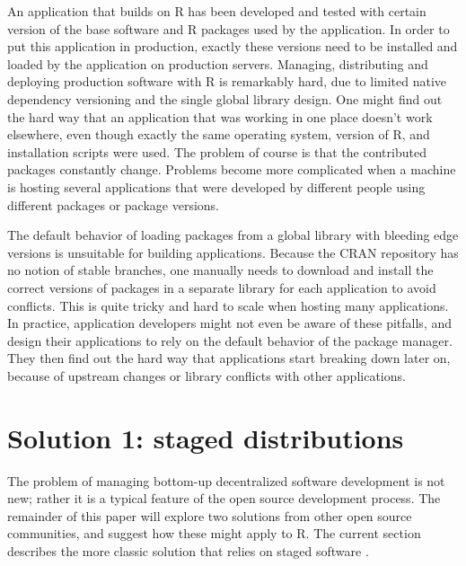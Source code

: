 An application that builds on R has been developed and tested with certain
version of the base software and R packages used by the application. In order
to put this application in production, exactly these versions need to be
installed and loaded by the application on production servers. Managing,
distributing and deploying production software with R is remarkably hard, due
to limited native dependency versioning and the single global library design.
One might find out the hard way that an application that was working in one
place doesn't work elsewhere, even though exactly the same operating system,
version of R, and installation scripts were used. The problem of course is that
the contributed packages constantly change. Problems become more complicated
when a machine is hosting several applications that were developed by different
people using different packages or package versions.

The default behavior of loading packages from a global library with bleeding
edge versions is unsuitable for building applications. Because the CRAN
repository has no notion of stable branches, one manually needs to download and
install the correct versions of packages in a separate library for each
application to avoid conflicts. This is quite tricky and hard to scale when
hosting many applications. In practice, application developers might not even be
aware of these pitfalls, and design their applications to rely on the default
behavior of the package manager. They then find out the hard way that
applications start breaking down later on, because of upstream changes or
library conflicts with other applications.

\section{Solution 1: staged distributions}

The problem of managing bottom-up decentralized software development is not
new; rather it is a typical feature of the open source development
process. The remainder of this paper will explore two solutions from other open
source communities, and suggest how these might apply to R. The current section
describes the more classic solution that relies on staged software
.

